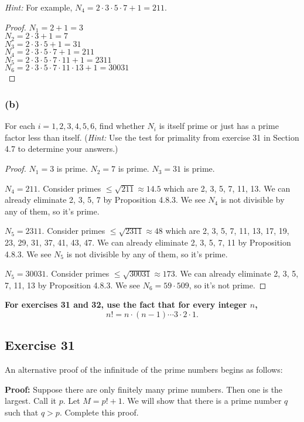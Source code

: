 \documentclass[14pt]{extarticle}
\newcommand{\cy}{\color{cyan}}
\begin{document}
    {\it Hint:} For example, $N_4 = 2\cdot3\cdot5\cdot7 + 1 = 211$.

\begin{proof}
    $N_1 = 2 + 1 = 3$\\
    $N_2 = 2\cdot3 + 1 = 7$\\
    $N_3 = 2\cdot3\cdot5 + 1 = 31$\\
    $N_4 = 2\cdot3\cdot5\cdot7 + 1 = 211$\\
    $N_5 = 2\cdot3\cdot5\cdot7\cdot11 + 1 = 2311$\\
    $N_6 = 2\cdot3\cdot5\cdot7\cdot11\cdot13 + 1 = 30031$\\
\end{proof}

\subsubsection{(b)}
For each $i = 1, 2, 3, 4, 5, 6$, find whether $N_i$ is itself prime or just has a prime factor less than itself. ({\it Hint:} Use the test for primality from exercise 31 in Section 4.7 to determine your answers.)

\begin{proof}
    $N_1 = 3$ is prime. $N_2 = 7$ is prime. $N_3 = 31$ is prime.

    $N_4 = 211$. Consider primes $\leq \sqrt{211} \approx 14.5$ which are 2, 3, 5, 7, 11, 13. We can already eliminate 2, 3, 5, 7 by Proposition 4.8.3. We see $N_4$ is not divisible by any of them, so it's prime.

    $N_5 = 2311$. Consider primes $\leq \sqrt{2311} \approx 48$ which are 2, 3, 5, 7, 11, 13, 17, 19, 23, 29, 31, 37, 41, 43, 47. We can already eliminate 2, 3, 5, 7, 11 by Proposition 4.8.3. We see $N_5$ is not divisible by any of them, so it's prime.

    $N_5 = 30031$. Consider primes $\leq \sqrt{30031} \approx 173$. We can already eliminate 2, 3, 5, 7, 11, 13 by Proposition 4.8.3. We see $N_6 = 59 \cdot 509$, so it's not prime.
\end{proof}

{\bf \cy For exercises 31 and 32, use the fact that for every integer $n$,
\[
    n! = n \cdot (n-1) \cdots 3\cdot 2\cdot 1.
\]
}
\subsection{Exercise 31}
An alternative proof of the infinitude of the prime numbers begins as follows:

{\bf Proof:} Suppose there are only finitely many prime numbers. Then one is the largest. Call it $p$. Let $M = p! + 1$. We will show that there is a prime number $q$ such that $q > p$. Complete this proof.
\end{document}
